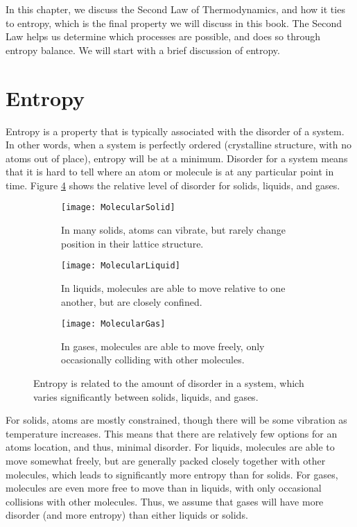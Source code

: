 In this chapter, we discuss the Second Law of Thermodynamics, and how it ties to entropy, which is the final property we will discuss in this book.  The Second Law helps us determine which processes are possible, and does so through entropy balance.  We will start with a brief discussion of entropy.

\section{Entropy}

Entropy is a property that is typically associated with the disorder of a system.  In other words, when a system is perfectly ordered (crystalline structure, with no atoms out of place), entropy will be at a minimum.  Disorder for a system means that it is hard to tell where an atom or molecule is at any particular point in time.  Figure \ref{fig:molecularEntropy} shows the relative level of disorder for solids, liquids, and gases.

\begin{figure}[H]
\centering
\begin{subfigure}{.3\textwidth}
  \centering
  \texttt{[image: MolecularSolid]}
  \caption{In many solids, atoms can vibrate, but rarely change position in their lattice structure.}
  \label{fig:molecularSolid}
\end{subfigure}\hfill
\begin{subfigure}{.3\textwidth}
  \centering
  \texttt{[image: MolecularLiquid]}
  \caption{In liquids, molecules are able to move relative to one another, but are closely confined.}
  \label{fig:molecularLiquid}
\end{subfigure}\hfill
\begin{subfigure}{.3\textwidth}
  \centering
  \texttt{[image: MolecularGas]}
  \caption{In gases, molecules are able to move freely, only occasionally colliding with other molecules.}
  \label{fig:molecularGas}
\end{subfigure}
\caption{Entropy is related to the amount of disorder in a system, which varies significantly between solids, liquids, and gases.}
\label{fig:molecularEntropy}
\end{figure}

For solids, atoms are mostly constrained, though there will be some vibration as temperature increases.  This means that there are relatively few options for an atoms location, and thus, minimal disorder.  For liquids, molecules are able to move somewhat freely, but are generally packed closely together with other molecules, which leads to significantly more entropy than for solids.  For gases, molecules are even more free to move than in liquids, with only occasional collisions with other molecules.  Thus, we assume that gases will have more disorder (and more entropy) than either liquids or solids.

